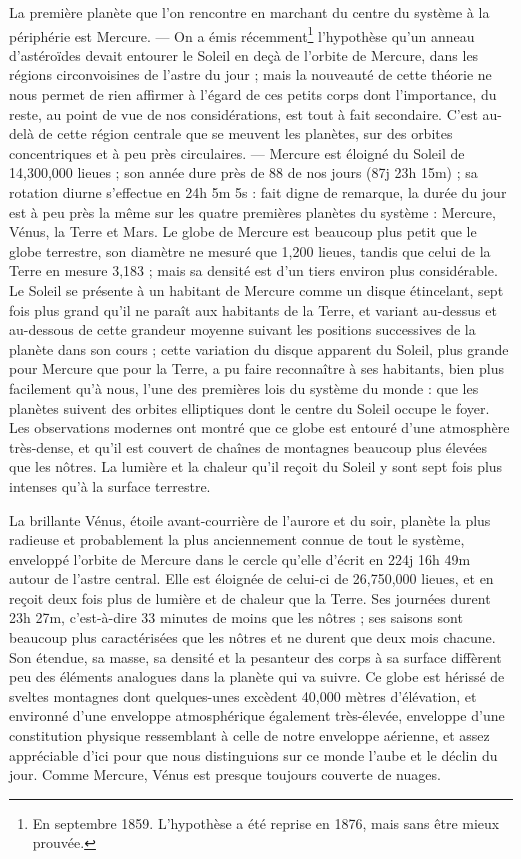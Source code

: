 \documentclass[a4paper, 11pt, oneside]{article}
\begin{document}
La première planète que l'on rencontre en marchant du centre du système à la périphérie est Mercure. --- On a émis récemment\footnote{En septembre 1859. L'hypothèse a été reprise en 1876, mais sans être mieux prouvée.} l'hypothèse qu'un anneau d'astéroïdes devait entourer le Soleil en deçà de l'orbite de Mercure, dans les régions circonvoisines de l'astre du jour ; mais la nouveauté de cette théorie ne nous permet de rien affirmer à l'égard de ces petits corps dont l'importance, du reste, au point de vue de nos considérations, est tout à fait secondaire. C'est au-delà de cette région centrale que se meuvent les planètes, sur des orbites concentriques et à peu près circulaires. --- Mercure est éloigné du Soleil de 14,300,000 lieues ; son année dure près de 88 de nos jours (87j 23h 15m) ; sa rotation diurne s'effectue en 24h 5m 5s : fait digne de remarque, la durée du jour est à peu près la même sur les quatre premières planètes du système : Mercure, Vénus, la Terre et Mars. Le globe de Mercure est beaucoup plus petit que le globe terrestre, son diamètre ne mesuré que 1,200 lieues, tandis que celui de la Terre en mesure 3,183 ; mais sa densité est d'un tiers environ plus considérable. Le Soleil se présente à un habitant de Mercure comme un disque étincelant, sept fois plus grand qu'il ne paraît aux habitants de la Terre, et variant au-dessus et au-dessous de cette grandeur moyenne suivant les positions successives de la planète dans son cours ; cette variation du disque apparent du Soleil, plus grande pour Mercure que pour la Terre, a pu faire reconnaître à ses habitants, bien plus facilement qu'à nous, l'une des premières lois du système du monde : que les planètes suivent des orbites elliptiques dont le centre du Soleil occupe le foyer. Les observations modernes ont montré que ce globe est entouré d'une atmosphère très-dense, et qu'il est couvert de chaînes de montagnes beaucoup plus élevées que les nôtres. La lumière et la chaleur qu'il reçoit du Soleil y sont sept fois plus intenses qu'à la surface terrestre.

La brillante Vénus, étoile avant-courrière de l'aurore et du soir, planète la plus radieuse et probablement la plus anciennement connue de tout le système, enveloppé l'orbite de Mercure dans le cercle qu'elle d'écrit en 224j 16h 49m autour de l'astre central. Elle est éloignée de celui-ci de 26,750,000 lieues, et en reçoit deux fois plus de lumière et de chaleur que la Terre. Ses journées durent 23h 27m, c'est-à-dire 33 minutes de moins que les nôtres ; ses saisons sont beaucoup plus caractérisées que les nôtres et ne durent que deux mois chacune. Son étendue, sa masse, sa densité et la pesanteur des corps à sa surface diffèrent peu des éléments analogues dans la planète qui va suivre. Ce globe est hérissé de sveltes montagnes dont quelques-unes excèdent 40,000 mètres d'élévation, et environné d'une enveloppe atmosphérique également très-élevée, enveloppe d'une constitution physique ressemblant à celle de notre enveloppe aérienne, et assez appréciable d'ici pour que nous distinguions sur ce monde l'aube et le déclin du jour. Comme Mercure, Vénus est presque toujours couverte de nuages.
\end{document}
